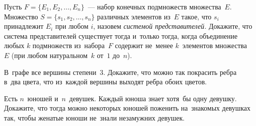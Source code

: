 \begin{problems}
\item
Пусть $F = \{ E_1, E_2, \ldots, E_n \}$~--- набор конечных подмножеств
множества~$E$.
Множество $S = \{ s_1, s_2, \ldots, s_n \}$ различных элементов из~$E$ такое,
что $s_i$ принадлежит $E_i$ при любом $i$, назовем
\emph{системой представителей.}
Докажите, что система представителей существует тогда и~только тогда, когда
объединение любых $k$ подмножеств из~набора~$F$ содержит не~менее $k$~элементов
множества~$E$ (при любом натуральном~$k$ от~$1$ до~$n$).

\item
В~графе все вершины степени~$3$.
Докажите, что можно так покрасить ребра в~два цвета, что из~каждой вершины
выходят ребра обоих цветов.

\item
Есть $n$~юношей и~$n$~девушек.
Каждый юноша знает хотя~бы одну девушку.
Докажите, что тогда можно некоторых юношей поженить на~знакомых девушках так,
чтобы женатые юноши не~знали незамужних девушек.

\end{problems}

